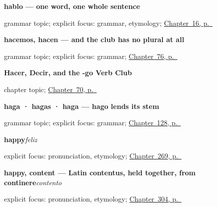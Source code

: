 \noindent\begin{minipage}[t]{\linewidth}
\raggedright
\textbf{hablo — one word, one whole sentence}\par
\footnotesize grammar topic; explicit focus: grammar, etymology; \hyperref[ch:first-verb]{Chapter~16, p.~\pageref*{ch:first-verb}}
\end{minipage}\par\smallskip

\noindent\begin{minipage}[t]{\linewidth}
\raggedright
\textbf{hacemos, hacen — and the club has no plural at all}\par
\footnotesize grammar topic; explicit focus: grammar; \hyperref[ch:spanish-derive-plurals]{Chapter~76, p.~\pageref*{ch:spanish-derive-plurals}}
\end{minipage}\par\smallskip

\noindent\begin{minipage}[t]{\linewidth}
\raggedright
\textbf{Hacer, Decir, and the -go Verb Club}\par
\footnotesize chapter topic; \hyperref[ch:yo-go-verbs]{Chapter~70, p.~\pageref*{ch:yo-go-verbs}}
\end{minipage}\par\smallskip

\noindent\begin{minipage}[t]{\linewidth}
\raggedright
\textbf{haga · hagas · haga — hago lends its stem}\par
\footnotesize grammar topic; explicit focus: grammar; \hyperref[ch:spanish-subjuntivo-yo-stem]{Chapter~128, p.~\pageref*{ch:spanish-subjuntivo-yo-stem}}
\end{minipage}\par\smallskip

\noindent\begin{minipage}[t]{\linewidth}
\raggedright
\textbf{happy}\enspace\emph{feliz}\par
\footnotesize explicit focus: pronunciation, etymology; \hyperref[ch:experiencia]{Chapter~269, p.~\pageref*{ch:experiencia}}
\end{minipage}\par\smallskip

\noindent\begin{minipage}[t]{\linewidth}
\raggedright
\textbf{happy, content — Latin contentus, held together, from continere}\enspace\emph{contento}\par
\footnotesize explicit focus: pronunciation, etymology; \hyperref[ch:como-estoy]{Chapter~304, p.~\pageref*{ch:como-estoy}}
\end{minipage}\par\smallskip

